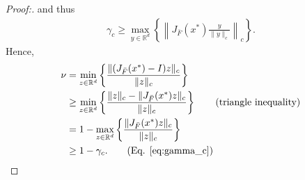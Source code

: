\documentclass[letterpaper, 10 pt]{article}
\begin{document}
\begin{proof}[Proof:]
and thus
\begin{align}\label{eq:gamma_c}
\gamma_c \geq \max_{y\in\mathbb{R}^d} \left\{ \left\| J_{\bar{F}}(x^*) \frac{y}{\|y\|_c} \right\|_c \right\}. 
\end{align} 
Hence,
\begin{align*}
\nu &= \min_{z\in\mathbb{R}^d} \left\{\frac{\|(J_{\bar{F}}(x^*)-I)z\|_c}{\|z\|_c} \right\} \\
&\geq \min_{z\in\mathbb{R}^d} \left\{ \frac{\|z\|_c - \|J_{\bar{F}}(x^*)z\|_c}{\|z\|_c} \right\} \tag{triangle inequality}\\
& = 1- \max_{z\in\mathbb{R}^d} \left\{ \frac{\|J_{\bar{F}}(x^*)z\|_c}{\|z\|_c} \right\} \\
& \geq 1- \gamma_c.\tag{Eq. \eqref{eq:gamma_c}}
\end{align*}
\end{proof}
\end{document}
